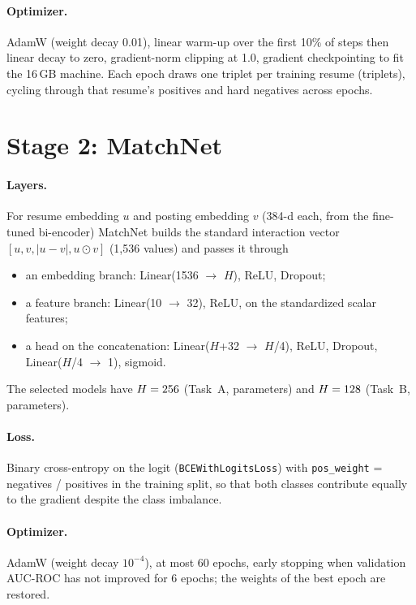 \documentclass[11pt,a4paper]{article}
\newcommand{\code}[1]{\texttt{\small #1}}
\begin{document}
\paragraph{Optimizer.} AdamW (weight decay 0.01), linear warm-up over the first 10\% of steps then
linear decay to zero, gradient-norm clipping at 1.0, gradient checkpointing to fit the 16\,GB
machine. Each epoch draws one triplet per training resume (\BiTriplets triplets), cycling through
that resume's positives and hard negatives across epochs.

\section{Stage 2: MatchNet}\label{sec:matchnet}
\paragraph{Layers.} For resume embedding $u$ and posting embedding $v$ (384-d each, from the
fine-tuned bi-encoder) MatchNet builds the standard interaction vector $[u, v, |u-v|, u \odot v]$
(1,536 values) and passes it through
\begin{itemize}
\item an embedding branch: Linear(1536 $\rightarrow$ $H$), ReLU, Dropout;
\item a feature branch: Linear(10 $\rightarrow$ 32), ReLU, on the standardized scalar features;
\item a head on the concatenation: Linear($H$+32 $\rightarrow$ $H$/4), ReLU, Dropout,
Linear($H$/4 $\rightarrow$ 1), sigmoid.
\end{itemize}
The selected models have $H = 256$ (Task~A, \MnAParams parameters) and
$H = 128$ (Task~B, \MnBParams parameters).

\paragraph{Loss.} Binary cross-entropy on the logit (\code{BCEWithLogitsLoss}) with
\code{pos\_weight} = negatives / positives in the training split, so that both classes contribute
equally to the gradient despite the class imbalance.

\paragraph{Optimizer.} AdamW (weight decay $10^{-4}$), at most 60 epochs, early stopping when
validation AUC-ROC has not improved for 6 epochs; the weights of the best epoch are restored.
\end{document}
